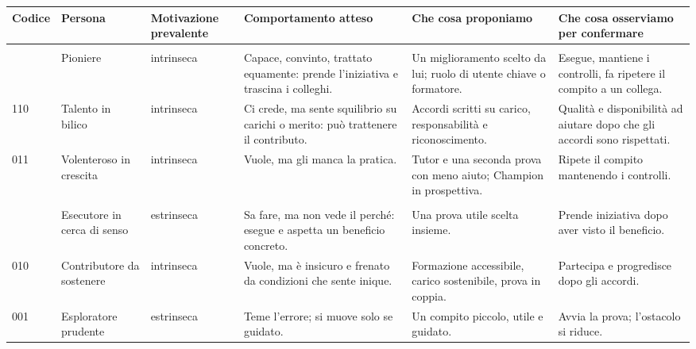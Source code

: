\documentclass[11pt,a4paper]{article}
\begin{document}
{\footnotesize\renewcommand{\arraystretch}{1.25}
\begin{xltabular}{\linewidth}{@{}>{\raggedright\arraybackslash{}\hsize\hspace{0pt}}X>{\raggedright\arraybackslash{}\hsize\hspace{0pt}}X>{\raggedright\arraybackslash{}\hsize\hspace{0pt}}X>{\raggedright\arraybackslash{}\hsize\hspace{0pt}}X>{\raggedright\arraybackslash{}\hsize\hspace{0pt}}X>{\raggedright\arraybackslash{}\hsize\hspace{0pt}}X@{}}
\toprule
\textbf{Codice} & \textbf{Persona} & \textbf{Motivazione prevalente} & \textbf{Comportamento atteso} & \textbf{Che cosa proponiamo} & \textbf{Che cosa osserviamo per confermare} \\
\midrule
\endhead
\addlinespace[3pt] \\ & Pioniere & intrinseca & Capace, convinto, trattato equamente: prende l'iniziativa e trascina i colleghi. & Un miglioramento scelto da lui; ruolo di utente chiave o formatore. & Esegue, mantiene i controlli, fa ripetere il compito a un collega. \\
110 & Talento in bilico & intrinseca & Ci crede, ma sente squilibrio su carichi o merito: può trattenere il contributo. & Accordi scritti su carico, responsabilità e riconoscimento. & Qualità e disponibilità ad aiutare dopo che gli accordi sono rispettati. \\
011 & Volenteroso in crescita & intrinseca & Vuole, ma gli manca la pratica. & Tutor e una seconda prova con meno aiuto; Champion in prospettiva. & Ripete il compito mantenendo i controlli. \\
\addlinespace[3pt] \\ & Esecutore in cerca di senso & estrinseca & Sa fare, ma non vede il perché: esegue e aspetta un beneficio concreto. & Una prova utile scelta insieme. & Prende iniziativa dopo aver visto il beneficio. \\
010 & Contributore da sostenere & intrinseca & Vuole, ma è insicuro e frenato da condizioni che sente inique. & Formazione accessibile, carico sostenibile, prova in coppia. & Partecipa e progredisce dopo gli accordi. \\
001 & Esploratore prudente & estrinseca & Teme l'errore; si muove solo se guidato. & Un compito piccolo, utile e guidato. & Avvia la prova; l'ostacolo si riduce. \\

\end{xltabular}}
\end{document}
